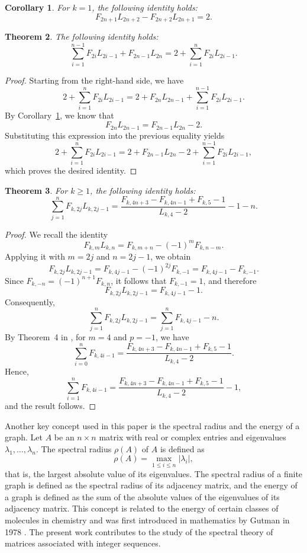 \documentclass[11pt]{birkjour}
\newtheorem{thm}{Theorem}[section]
\newtheorem{cor}[thm]{Corollary}
\theoremstyle{definition}
\theoremstyle{remark}
\numberwithin{equation}{section}
\begin{document}
\begin{cor}\label{aux1}
For $k=1$, the following identity holds:
\[
F_{2n+1}L_{2n+2}-F_{2n+2}L_{2n+1}=2.
\]
\end{cor}


\begin{thm}\label{aux2}
The following identity holds:
\[
\sum_{i=1}^{n-1}F_{2i}L_{2i-1}+F_{2n-1}L_{2n}
=
2+\sum_{i=1}^{n}F_{2i}L_{2i-1}.
\]
\end{thm}

\begin{proof}
Starting from the right-hand side, we have
\[
2+\sum_{i=1}^{n}F_{2i}L_{2i-1}
=
2+F_{2n}L_{2n-1}+\sum_{i=1}^{n-1}F_{2i}L_{2i-1}.
\]
By Corollary~\ref{aux1}, we know that
\[
F_{2n}L_{2n-1}=F_{2n-1}L_{2n}-2.
\]
Substituting this expression into the previous equality yields
\[
2+\sum_{i=1}^{n}F_{2i}L_{2i-1}
=
2+F_{2n-1}L_{2n}-2+\sum_{i=1}^{n-1}F_{2i}L_{2i-1},
\]
which proves the desired identity.
\end{proof}

\begin{thm}\label{sumgen}
For $k \geq 1$, the following identity holds:
\[
\sum_{j=1}^{n}F_{k,2j}L_{k,2j-1}
=
\frac{F_{k,4n+3}-F_{k,4n-1}+F_{k,5}-1}{L_{k,4}-2}-1-n.
\]
\end{thm}

\begin{proof}
We recall the identity
\[
F_{k,m}L_{k,n}=F_{k,m+n}-(-1)^mF_{k,n-m}.
\]
Applying it with $m=2j$ and $n=2j-1$, we obtain
\[
F_{k,2j}L_{k,2j-1}
=
F_{k,4j-1}-(-1)^{2j}F_{k,-1}
=
F_{k,4j-1}-F_{k,-1}.
\]
Since $F_{k,-n}=(-1)^{n+1}F_{k,n}$, it follows that $F_{k,-1}=1$, and therefore
\[
F_{k,2j}L_{k,2j-1}=F_{k,4j-1}-1.
\]
Consequently,
\[
\sum_{j=1}^{n}F_{k,2j}L_{k,2j-1}
=
\sum_{j=1}^{n}F_{k,4j-1}-n.
\]
By Theorem~4 in \cite{FalconPlaza2009}, for $m=4$ and $p=-1$, we have
\[
\sum_{i=0}^{n}F_{k,4i-1}
=
\frac{F_{k,4n+3}-F_{k,4n-1}+F_{k,5}-1}{L_{k,4}-2}.
\]
Hence,
\[
\sum_{i=1}^{n}F_{k,4i-1}
=
\frac{F_{k,4n+3}-F_{k,4n-1}+F_{k,5}-1}{L_{k,4}-2}-1,
\]
and the result follows.
\end{proof}

\noindent Another key concept used in this paper is the spectral radius and the energy of a graph.
Let $A$ be an $n \times n$ matrix with real or complex entries and eigenvalues
$\lambda_1,\ldots,\lambda_n$.
The spectral radius $\rho(A)$ of $A$ is defined as
\[
\rho(A)=\max_{1 \leq i \leq n}|\lambda_i|,
\]
that is, the largest absolute value of its eigenvalues.
The spectral radius of a finite graph is defined as the spectral radius of its adjacency matrix,
and the energy of a graph is defined as the sum of the absolute values of the eigenvalues of its adjacency matrix.
This concept is related to the energy of certain classes of molecules in chemistry and was first introduced in mathematics by Gutman in 1978 \cite{Gutman}.
The present work contributes to the study of the spectral theory of matrices associated with integer sequences.
\end{document}
